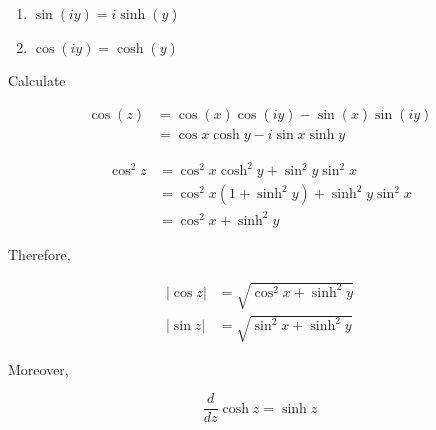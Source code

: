 \documentclass{article}
\newtheorem{one minute paper}[theorem]{One Minute Paper}
\begin{document}
\begin{enumerate}
    \item $\sin(iy) = i\sinh(y)$
    \item $\cos(iy) = \cosh(y)$
\end{enumerate}

Calculate 

\begin{align}
    \cos(z) &= \cos(x)\cos(iy) - \sin(x)\sin(iy) \\
    &= \cos x\cosh y - i \sin x \sinh y
\end{align}

\begin{align}
    \cos^2 z &= \cos^2 x \cosh^2 y  + \sin^2 y \sin^2 x \\
    &= \cos^2x (1 + \sinh^2 y) + \sinh^2 y \sin^2x \\
    &= \cos^2 x + \sinh^2 y
\end{align}

Therefore, 

\begin{align}
    |\cos z| &= \sqrt{\cos^2 x + \sinh^2 y} \\
    |\sin z| &= \sqrt{\sin^2 x + \sinh^2 y}
\end{align}

Moreover, 

\begin{equation}
    \frac{d}{dz}\cosh z = \sinh z
\end{equation}
\end{document}
